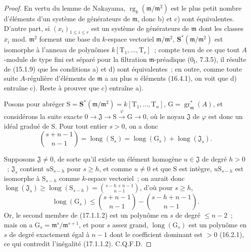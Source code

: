 \begin{proof}
En vertu du lemme de Nakayama,
$\operatorname{rg}_k(\mathfrak{m}/\mathfrak{m}^2)$ est le plus petit nombre
d'éléments d'un système de générateurs de $\mathfrak{m}$, donc b) et c) sont
équivalentes. D'autre part, si $(x_i)_{1\leq i\leq r}$ est un système de
générateurs de $\mathfrak{m}$ dont les classes $\overline{x}_i$ mod.
$\mathfrak{m}^2$ forment une base du $k$-espace vectoriel
$\mathfrak{m}/\mathfrak{m}^2$, $\mathbf{S}^*(\mathfrak{m}/\mathfrak{m}^2)$
est isomorphe à l'anneau de
polynômes $k[\mathrm{T}_1,\ldots,\mathrm{T}_r]$~; compte tenu de ce que tout
$A$-module de type fini est séparé pour la filtration $\mathfrak{m}$-préadique
($0_{\mathrm I}$, 7.3.5), il résulte de (15.1.9) que les conditions a) et d)
sont équivalentes~; en outre, comme toute suite $A$-régulière d'éléments de
$\mathfrak{m}$ a au plus $n$ éléments (16.4.1), on voit que d) entraîne c).
Reste à prouver que c) entraîne a).

Posons pour abréger
$\mathrm{S}=\mathbf{S}^*(\mathfrak{m}/\mathfrak{m}^2)
=k[\mathrm{T}_1,\ldots,\mathrm{T}_n]$,
$\mathrm{G}=\operatorname{gr}^*_{\mathfrak{m}}(A)$, et considérons la suite
exacte
$0\longrightarrow\mathfrak{J}\longrightarrow\mathrm{S}
\xrightarrow{\varphi}\mathrm{G}\longrightarrow0$, où le noyau
$\mathfrak{J}$ de $\varphi$ est donc un idéal gradué de $\mathrm{S}$. Pour
tout entier $s>0$, on a donc
\begin{equation}
\label{0.17.1.1.1-fr}
\tag{17.1.1.1}
  \binom{s+n-1}{n-1}
  =\operatorname{long}(\mathrm{S}_s)
  =\operatorname{long}(\mathrm{G}_s)
  +\operatorname{long}(\mathfrak{J}_s).
\end{equation}

Supposons $\mathfrak{J}\neq0$, de sorte qu'il existe un élément homogène
$u\in\mathfrak{J}$ de degré $h>0$~; $\mathfrak{J}_s$ contient
$u\mathrm{S}_{s-h}$ pour $s\geq h$, et comme $u\neq0$ et que $\mathrm{S}$ est
intègre, $u\mathrm{S}_{s-h}$ est isomorphe à $\mathrm{S}_{s-h}$ comme
$k$-espace vectoriel~; on aurait donc
$\operatorname{long}(\mathfrak{J}_s)\geq
\operatorname{long}(\mathrm{S}_{s-h})=\binom{s-h+n-1}{n-1}$, d'où pour
$s\geq h$,
\begin{equation}
\label{0.17.1.1.2-fr}
\tag{17.1.1.2}
  \operatorname{long}(\mathrm{G}_s)
  \leq\binom{s+n-1}{n-1}-\binom{s-h+n-1}{n-1}.
\end{equation}
Or, le second membre de (17.1.1.2) est un polynôme en $s$ de degré
$\leq n-2$~; mais on a
$\mathrm{G}_s=\mathfrak{m}^s/\mathfrak{m}^{s+1}$, et pour $s$ assez grand,
$\operatorname{long}(\mathrm{G}_s)$ est un polynôme en $s$ de degré exactement
égal à $n-1$ dont le coefficient dominant est $>0$ (16.2.1), ce qui contredit
l'inégalité (17.1.1.2). C.Q.F.D.
\end{proof}

